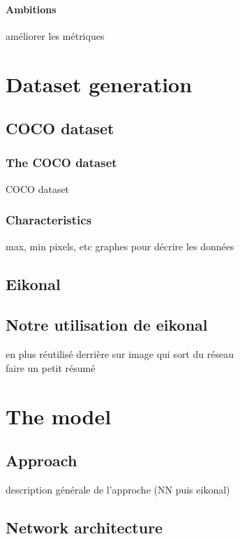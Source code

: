 \documentclass{article}
\begin{document}
            \paragraph{Ambitions}
            améliorer les métriques









\section{Dataset generation}
    \subsection{COCO dataset}
        \subsubsection{The COCO dataset}
        COCO dataset
        \subsubsection{Characteristics}
        \label{par:charac}

        max, min pixels, etc
        graphes pour décrire les données
    \subsection{Eikonal}
    \subsection{Notre utilisation de eikonal}
    en plus réutilisé derrière sur image qui sort du réseau\\
    faire un petit résumé









\section{The model}
    \subsection{Approach}
    description générale de l'approche (NN puis eikonal)
    \subsection{Network architecture}
\end{document}
